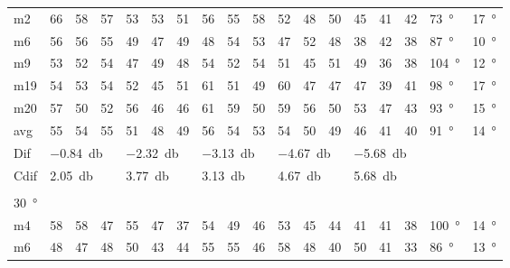 \begin{table}[H]
\begin{tabular}{l|l|l|l|l|l|l|l|l|l|l|l|l|l|l|l|l|l}
m2    & 66     &  58    &  57    &  53    &  53    &  51    &  56    &   55    &  58    &  52     &  48    &  50    & 45 & 41 & 42 &  \SI{73}{\degree} & \SI{17}{\degree} \\
m6    & 56     &  56    &  55    & 49     &  47    &  49    &   48   &   54    &   53   &   47    &  52    &  48    & 38 & 42 & 38 &  \SI{87}{\degree} & \SI{10}{\degree} \\
m9    &  53    &  52    & 54     &  47    &   49   &   48   &   54   &   52    &  54    &   51    &  45   &  51    & 49 & 36 & 38 & \SI{104}{\degree} & \SI{12}{\degree} \\
m19  &    54  &  53    &  54    &  52    &  45    &    51  &   61   &   51    &   49   &   60    &  47   &   47   & 47 & 39 & 41 & \SI{98}{\degree} & \SI{17}{\degree} \\
m20  & 57     &  50    &  52    &  56    &  46    &    46  &   61   &   59    &   50   &  59     &  56    &   50   & 53 & 47 &  43&  \SI{93}{\degree} & \SI{15}{\degree} \\ \hline
avg & 55     &  54    &  55    &  51    &  48    &   49   &  56    &  54     & 53     &  54     &  50    &   49   & 46 & 41  &40 &  \SI{91}{\degree} & \SI{14}{\degree} \\ \hline  
Dif & \multicolumn{3}{l|}{\SI{-0.84}{\decibel}} & \multicolumn{3}{l|}{\SI{-2.32}{\decibel}} & \multicolumn{3}{l|}{\SI{-3.13}{\decibel}} & \multicolumn{3}{l|}{\SI{-4.67}{\decibel}} &  \multicolumn{3}{l|}{\SI{-5.68}{\decibel}} &  \multicolumn{2}{l}{}  \\ \hline 
Cdif & \multicolumn{3}{l|}{\SI{2.05}{\decibel}} & \multicolumn{3}{l|}{\SI{3.77}{\decibel}} & \multicolumn{3}{l|}{\SI{3.13}{\decibel}} & \multicolumn{3}{l|}{\SI{4.67}{\decibel}} & \multicolumn{3}{l|}{\SI{5.68}{\decibel}}  &   \multicolumn{2}{l}{}   \\ 
 \multicolumn{18}{l}{ } \\                         
\SI{30}{\degree}   & \multicolumn{3}{l|}{} & \multicolumn{3}{l|}{} & \multicolumn{3}{l|}{} & \multicolumn{3}{l|}{} &  \multicolumn{3}{l|}{} &  \multicolumn{2}{l}{}   \\  \hline
m4    &  58    &  58    & 47     & 55     &  47    &   37   &   54   &   49    &  46    &   53    &   45   &   44   & 41 & 41 & 38 & \SI{100}{\degree} & \SI{14}{\degree} \\
m6    &  48    &   47   &  48    & 50     &   43   &  44    &    55  &   55    &  46    &   58    &   48   &   40   & 50 & 41 & 33 & \SI{86}{\degree} & \SI{13}{\degree} \\

\end{tabular}
\end{table}
